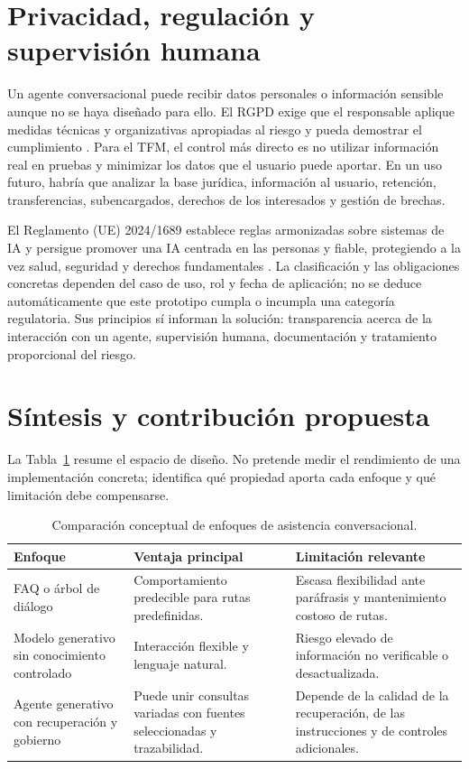\documentclass[12pt,twoside,titlepage]{book}
\begin{document}
\section{Privacidad, regulación y supervisión humana}
\label{sec:privacidad-regulacion}

Un agente conversacional puede recibir datos personales o información sensible
aunque no se haya diseñado para ello. El RGPD exige que el responsable aplique
medidas técnicas y organizativas apropiadas al riesgo y pueda demostrar el
cumplimiento \cite{gdpr}. Para el TFM, el control más directo es no utilizar
información real en pruebas y minimizar los datos que el usuario puede aportar.
En un uso futuro, habría que analizar la base jurídica, información al usuario,
retención, transferencias, subencargados, derechos de los interesados y gestión
de brechas.

El Reglamento (UE) 2024/1689 establece reglas armonizadas sobre sistemas de IA y
persigue promover una IA centrada en las personas y fiable, protegiendo a la vez
salud, seguridad y derechos fundamentales \cite{aiAct}. La clasificación y las
obligaciones concretas dependen del caso de uso, rol y fecha de aplicación; no se
deduce automáticamente que este prototipo cumpla o incumpla una categoría
regulatoria. Sus principios sí informan la solución: transparencia acerca de la
interacción con un agente, supervisión humana, documentación y tratamiento
proporcional del riesgo.

\section{Síntesis y contribución propuesta}
\label{sec:sintesis-estado-arte}

La Tabla~\ref{tab:comparacion-enfoques} resume el espacio de diseño. No pretende
medir el rendimiento de una implementación concreta; identifica qué propiedad
aporta cada enfoque y qué limitación debe compensarse.

\begin{table}[H]
\centering
\caption{Comparación conceptual de enfoques de asistencia conversacional.}
\label{tab:comparacion-enfoques}
\begin{tabular}{p{}p{}p{}}
\hline
\textbf{Enfoque} & \textbf{Ventaja principal} & \textbf{Limitación relevante}\\
\hline
FAQ o árbol de diálogo & Comportamiento predecible para rutas predefinidas. &
Escasa flexibilidad ante paráfrasis y mantenimiento costoso de rutas.\\
Modelo generativo sin conocimiento controlado & Interacción flexible y lenguaje
natural. & Riesgo elevado de información no verificable o desactualizada.\\
Agente generativo con recuperación y gobierno & Puede unir consultas variadas con
fuentes seleccionadas y trazabilidad. & Depende de la calidad de la recuperación,
de las instrucciones y de controles adicionales.\\
\hline
\end{tabular}
\end{table}
\end{document}
